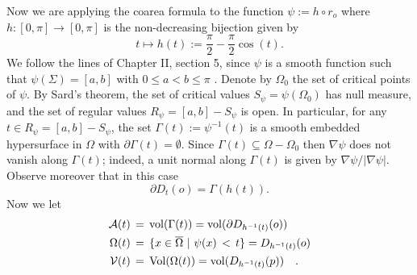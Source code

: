 \documentclass{amsart}
\theoremstyle{definition}
\theoremstyle{remark}
\begin{document}
Now we are applying  the coarea formula to the function $\psi:=h\circ r_o$ where $h:[0,\pi]\to [0,\pi]$ is the non-decreasing bijection  given by
$$
t\mapsto h(t):=\frac{\pi}{2}-\frac{\pi}{2}\cos(t).
$$
We follow the lines of \cite{Sakai} Chapter II, section 5,  since $\psi$ is a smooth function such that $\psi(\Sigma)=[a,b]$ with $0\leq a<b\leq \pi$ . Denote by $\Omega_0$ the set of critical points of $\psi$. By Sard's theorem, the set of critical values $S_\psi=\psi(\Omega_0)$ has null measure, and the set of regular values $R_\psi=[a,b]-S_\psi$ is open. In particular, for any $t\in R_\psi=[a,b]-S_\psi$, the set $\Gamma(t):=\psi^{-1}(t)$ is a smooth embedded hypersurface in $\Omega$ with $\partial \Gamma(t)=\emptyset$. Since $\Gamma(t)\subseteq\Omega-\Omega_0$ then $\nabla\psi$ does not vanish along $\Gamma(t)$; indeed, a unit normal along $\Gamma(t)$ is given by $\nabla\psi/|\nabla\psi|$. Observe moreover that in this case
$$
\partial D_{t}(o)=\Gamma(h(t)).
$$
Now we let
\begin{equation}
\begin{aligned}
 \mathcal{A}(t) \, &= \, {\rm vol}(\Gamma(t))={\rm vol}(\partial D_{h^{-1}(t)}(o) ) \\
\Omega(t) \, &= \,  \{ x \in \overline{\Omega} \, \, | \, \, \psi(x)
 \, <
\, t\} =D_{h^{-1}(t)}(o)\\
\mathcal{V}(t) \, &= \,  \operatorname{Vol}(\Omega(t)) ={\rm vol}(D_{h^{-1}(t)}(p))\quad .
\end{aligned}
\end{equation}
\end{document}
